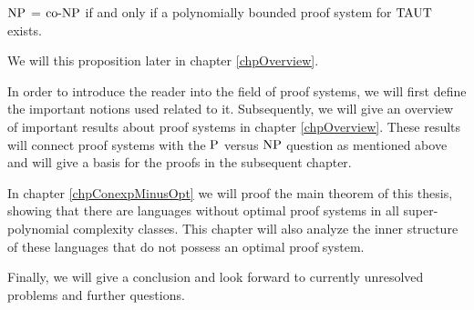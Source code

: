   \begin{proposition} \label{prpNPcoNP}
    \(\NP\) = \(\coNP\) if and only if a polynomially bounded proof system for \(\TAUT\) exists.
  \end{proposition}

  We will this proposition later in chapter \ref{chpOverview}.
  
  In order to introduce the reader into the field of proof systems, we will first define the important notions used related to it. Subsequently, we will give an overview of important results about proof systems in chapter \ref{chpOverview}. These results will connect proof systems with the \(\P\) versus \(\NP\) question as mentioned above and will give a basis for the proofs in the subsequent chapter.

  In chapter \ref{chpConexpMinusOpt} we will proof the main theorem of this thesis, showing that there are languages without optimal proof systems in all super-polynomial complexity classes. This chapter will also analyze the inner structure of these languages that do not possess an optimal proof system.

  Finally, we will give a conclusion and look forward to currently unresolved problems and further questions.

